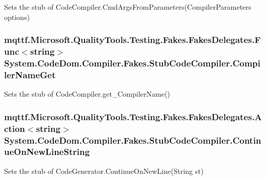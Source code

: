 Sets the stub of Code\-Compiler.\-Cmd\-Args\-From\-Parameters(\-Compiler\-Parameters options)

\hypertarget{class_system_1_1_code_dom_1_1_compiler_1_1_fakes_1_1_stub_code_compiler_a1592c0988e2ce3f32515d11d59f7a268}{
\subsubsection[{Compiler\-Name\-Get}]{\setlength{\rightskip}{0pt plus 5cm}mqttf.\-Microsoft.\-Quality\-Tools.\-Testing.\-Fakes.\-Fakes\-Delegates.\-Func$<$string$>$ System.\-Code\-Dom.\-Compiler.\-Fakes.\-Stub\-Code\-Compiler.\-Compiler\-Name\-Get}}\label{class_system_1_1_code_dom_1_1_compiler_1_1_fakes_1_1_stub_code_compiler_a1592c0988e2ce3f32515d11d59f7a268}


Sets the stub of Code\-Compiler.\-get\-\_\-\-Compiler\-Name()

\hypertarget{class_system_1_1_code_dom_1_1_compiler_1_1_fakes_1_1_stub_code_compiler_a13c69a5743d57c7f1189e6544323189f}{
\subsubsection[{Continue\-On\-New\-Line\-String}]{\setlength{\rightskip}{0pt plus 5cm}mqttf.\-Microsoft.\-Quality\-Tools.\-Testing.\-Fakes.\-Fakes\-Delegates.\-Action$<$string$>$ System.\-Code\-Dom.\-Compiler.\-Fakes.\-Stub\-Code\-Compiler.\-Continue\-On\-New\-Line\-String}}\label{class_system_1_1_code_dom_1_1_compiler_1_1_fakes_1_1_stub_code_compiler_a13c69a5743d57c7f1189e6544323189f}


Sets the stub of Code\-Generator.\-Continue\-On\-New\-Line(\-String st)

